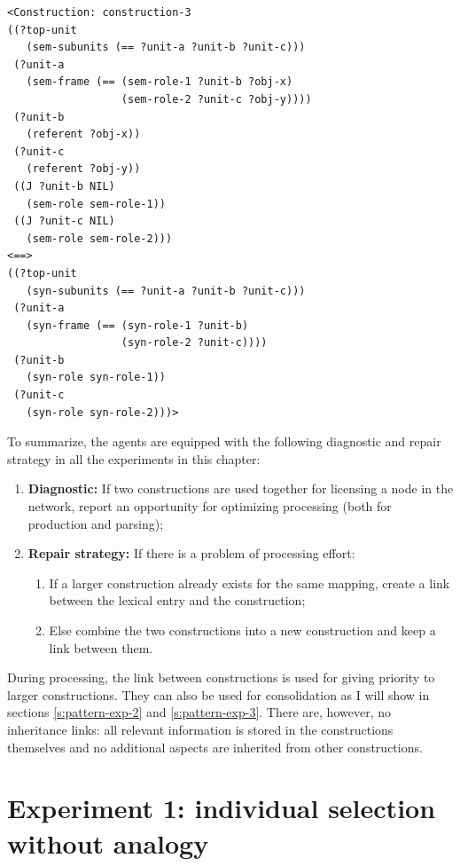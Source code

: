 \begin{lstlisting}
<Construction: construction-3
((?top-unit
   (sem-subunits (== ?unit-a ?unit-b ?unit-c)))
 (?unit-a
   (sem-frame (== (sem-role-1 ?unit-b ?obj-x)
                  (sem-role-2 ?unit-c ?obj-y))))
 (?unit-b
   (referent ?obj-x))
 (?unit-c
   (referent ?obj-y))
 ((J ?unit-b NIL)
   (sem-role sem-role-1))
 ((J ?unit-c NIL)
   (sem-role sem-role-2)))
<==>
((?top-unit
   (syn-subunits (== ?unit-a ?unit-b ?unit-c)))
 (?unit-a
   (syn-frame (== (syn-role-1 ?unit-b)
                  (syn-role-2 ?unit-c))))
 (?unit-b
   (syn-role syn-role-1))
 (?unit-c
   (syn-role syn-role-2)))>
\end{lstlisting}


\noindent To summarize, the agents are equipped with the following diagnostic and repair strategy in all the experiments in this chapter:

\begin{enumerate}
\item {\bfseries Diagnostic:} If two constructions are used together for licensing a node in the network, report an opportunity for optimizing processing (both for production and parsing);
\item {\bfseries Repair strategy:} If there is a problem of processing effort: 
\begin{enumerate}
\item If a larger construction already exists for the same mapping, create a link between the lexical entry and the construction;
\item Else combine the two constructions into a new construction and keep a link between them.
\end{enumerate}
\end{enumerate}

During processing, the link between constructions is used for giving priority to larger constructions. They can also be used for consolidation as I will show in sections \ref{s:pattern-exp-2} and \ref{s:pattern-exp-3}. There are, however, no inheritance links: all relevant information is stored in the constructions themselves and no additional aspects are inherited from other constructions.

\section{Experiment 1: individual selection without analogy}
\label{s:pattern-exp-1}

